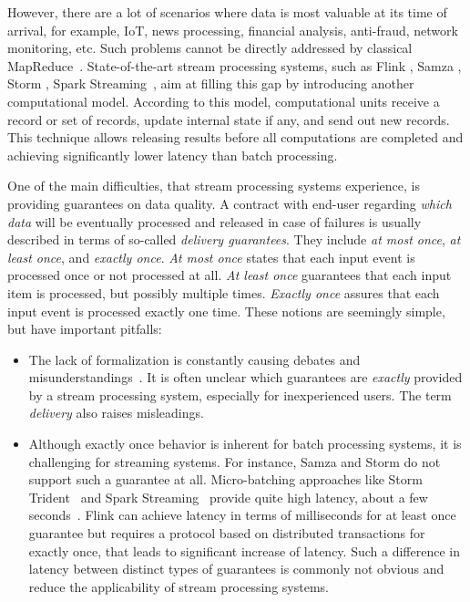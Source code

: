 However, there are a lot of scenarios where data is most valuable at its time of arrival, for example, IoT, news processing, financial analysis, anti-fraud, network monitoring, etc. Such problems cannot be directly addressed by classical MapReduce~\cite{Doulkeridis:2014:SLA:2628707.2628782}. State-of-the-art stream processing systems, such as Flink \cite{carbone2015apache}, Samza \cite{Noghabi:2017:SSS:3137765.3137770}, Storm \cite{apache:storm}, Spark Streaming~\cite{Zaharia:2012:DSE:2342763.2342773}, aim at filling this gap by introducing another computational model. According to this model, computational units receive a record or set of records, update internal state if any, and send out new records. This technique allows releasing results before all computations are completed and achieving significantly lower latency than batch processing. 

One of the main difficulties, that stream processing systems experience, is providing guarantees on data quality. A contract with end-user regarding {\em which data} will be eventually processed and released in case of failures is usually described in terms of so-called {\em delivery guarantees}. They include {\em at most once}, {\em at least once}, and {\em exactly once}. {\it At most once} states that each input event is processed once or not processed at all. {\it At least once} guarantees that each input item is processed, but possibly multiple times. {\it Exactly once} assures that each input event is processed exactly one time. These notions are seemingly simple, but have important pitfalls:

\begin{itemize}
    \item The lack of formalization is constantly causing debates and misunderstandings~\cite{JerryPengStreamIO, PaperTrail}. It is often unclear which guarantees are {\em exactly} provided by a stream processing system, especially for inexperienced users. The term {\em delivery} also raises misleadings.  
    \item Although exactly once behavior is inherent for batch processing systems, it is challenging for streaming systems. For instance, Samza and Storm do not support such a guarantee at all. Micro-batching approaches like Storm Trident~\cite{apache:storm:trident} and Spark Streaming~\cite{Zaharia:2012:DSE:2342763.2342773} provide quite high latency, about a few seconds~\cite{7530084, 7474816}. Flink can achieve latency in terms of milliseconds for at least once guarantee but requires a protocol based on distributed transactions for exactly once, that leads to significant increase of latency. Such a difference in latency between distinct types of guarantees is commonly not obvious and reduce the applicability of stream processing systems.
\end{itemize}

